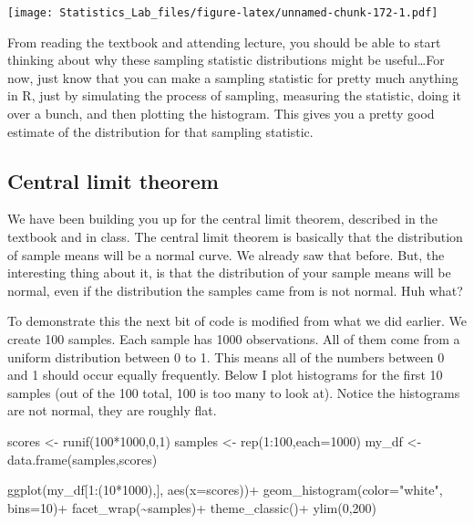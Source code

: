 \documentclass[
]{book}
\newenvironment{Shaded}{\begin{snugshade}}{\end{snugshade}}
\newcommand{\AttributeTok}[1]{\textcolor[rgb]{0.77,0.63,0.00}{#1}}
\newcommand{\DecValTok}[1]{\textcolor[rgb]{0.00,0.00,0.81}{#1}}
\newcommand{\FunctionTok}[1]{\textcolor[rgb]{0.00,0.00,0.00}{#1}}
\newcommand{\NormalTok}[1]{#1}
\newcommand{\OtherTok}[1]{\textcolor[rgb]{0.56,0.35,0.01}{#1}}
\newcommand{\SpecialCharTok}[1]{\textcolor[rgb]{0.00,0.00,0.00}{#1}}
\newcommand{\StringTok}[1]{\textcolor[rgb]{0.31,0.60,0.02}{#1}}
\begin{document}
\texttt{[image: Statistics\_Lab\_files/figure-latex/unnamed-chunk-172-1.pdf]}

From reading the textbook and attending lecture, you should be able to start thinking about why these sampling statistic distributions might be useful\ldots For now, just know that you can make a sampling statistic for pretty much anything in R, just by simulating the process of sampling, measuring the statistic, doing it over a bunch, and then plotting the histogram. This gives you a pretty good estimate of the distribution for that sampling statistic.

\hypertarget{central-limit-theorem}{%
\subsection{Central limit theorem}\label{central-limit-theorem}}

We have been building you up for the central limit theorem, described in the textbook and in class. The central limit theorem is basically that the distribution of sample means will be a normal curve. We already saw that before. But, the interesting thing about it, is that the distribution of your sample means will be normal, even if the distribution the samples came from is not normal. Huh what?

To demonstrate this the next bit of code is modified from what we did earlier. We create 100 samples. Each sample has 1000 observations. All of them come from a uniform distribution between 0 to 1. This means all of the numbers between 0 and 1 should occur equally frequently. Below I plot histograms for the first 10 samples (out of the 100 total, 100 is too many to look at). Notice the histograms are not normal, they are roughly flat.

\begin{Shaded}
\begin{Highlighting}[]
\NormalTok{scores }\OtherTok{\textless{}{-}} \FunctionTok{runif}\NormalTok{(}\DecValTok{100}\SpecialCharTok{*}\DecValTok{1000}\NormalTok{,}\DecValTok{0}\NormalTok{,}\DecValTok{1}\NormalTok{)}
\NormalTok{samples }\OtherTok{\textless{}{-}} \FunctionTok{rep}\NormalTok{(}\DecValTok{1}\SpecialCharTok{:}\DecValTok{100}\NormalTok{,}\AttributeTok{each=}\DecValTok{1000}\NormalTok{)}
\NormalTok{my\_df }\OtherTok{\textless{}{-}} \FunctionTok{data.frame}\NormalTok{(samples,scores)}

\FunctionTok{ggplot}\NormalTok{(my\_df[}\DecValTok{1}\SpecialCharTok{:}\NormalTok{(}\DecValTok{10}\SpecialCharTok{*}\DecValTok{1000}\NormalTok{),], }\FunctionTok{aes}\NormalTok{(}\AttributeTok{x=}\NormalTok{scores))}\SpecialCharTok{+}
  \FunctionTok{geom\_histogram}\NormalTok{(}\AttributeTok{color=}\StringTok{"white"}\NormalTok{, }\AttributeTok{bins=}\DecValTok{10}\NormalTok{)}\SpecialCharTok{+}
  \FunctionTok{facet\_wrap}\NormalTok{(}\SpecialCharTok{\textasciitilde{}}\NormalTok{samples)}\SpecialCharTok{+}
  \FunctionTok{theme\_classic}\NormalTok{()}\SpecialCharTok{+}
  \FunctionTok{ylim}\NormalTok{(}\DecValTok{0}\NormalTok{,}\DecValTok{200}\NormalTok{)}
\end{Highlighting}
\end{Shaded}
\end{document}
